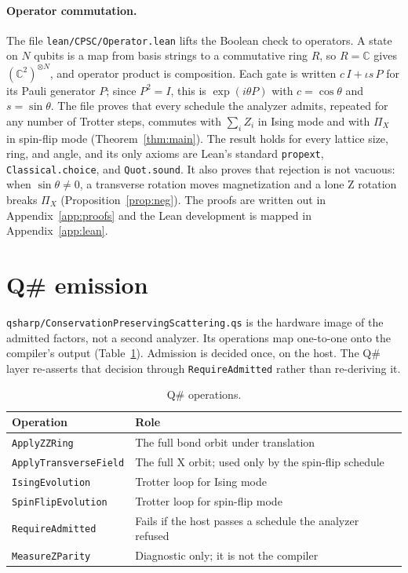 \documentclass[11pt]{article}
\theoremstyle{definition}
\newcommand{\lean}[1]{\texttt{#1}}
\newcommand{\PiX}{\Pi_X}
\begin{document}
\paragraph{Operator commutation.}
The file \lean{lean/CPSC/Operator.lean} lifts the Boolean check to operators. A state on $N$ qubits is a map from basis strings to a commutative ring $R$, so $R = \mathbb{C}$ gives $(\mathbb{C}^2)^{\otimes N}$, and operator product is composition. Each gate is written $c\,I + \iota s\,P$ for its Pauli generator $P$; since $P^2 = I$, this is $\exp(i\theta P)$ with $c = \cos\theta$ and $s = \sin\theta$. The file proves that every schedule the analyzer admits, repeated for any number of Trotter steps, commutes with $\sum_i Z_i$ in Ising mode and with $\PiX$ in spin-flip mode (Theorem~\ref{thm:main}). The result holds for every lattice size, ring, and angle, and its only axioms are Lean's standard \lean{propext}, \lean{Classical.choice}, and \lean{Quot.sound}. It also proves that rejection is not vacuous: when $\sin\theta \neq 0$, a transverse rotation moves magnetization and a lone Z rotation breaks $\PiX$ (Proposition~\ref{prop:neg}). The proofs are written out in Appendix~\ref{app:proofs} and the Lean development is mapped in Appendix~\ref{app:lean}.

\section{Q\# emission}

\lean{qsharp/ConservationPreservingScattering.qs} is the hardware image of the admitted factors, not a second analyzer. Its operations map one-to-one onto the compiler's output (Table~\ref{tab:qsharp}). Admission is decided once, on the host. The Q\# layer re-asserts that decision through \lean{RequireAdmitted} rather than re-deriving it.

\begin{table}[h]
\centering
\begin{tabular}{@{}ll@{}}
\toprule
Operation & Role \\
\midrule
\lean{ApplyZZRing} & The full bond orbit under translation \\
\lean{ApplyTransverseField} & The full X orbit; used only by the spin-flip schedule \\
\lean{IsingEvolution} & Trotter loop for Ising mode \\
\lean{SpinFlipEvolution} & Trotter loop for spin-flip mode \\
\lean{RequireAdmitted} & Fails if the host passes a schedule the analyzer refused \\
\lean{MeasureZParity} & Diagnostic only; it is not the compiler \\
\bottomrule
\end{tabular}
\caption{Q\# operations.}
\label{tab:qsharp}
\end{table}
\end{document}
